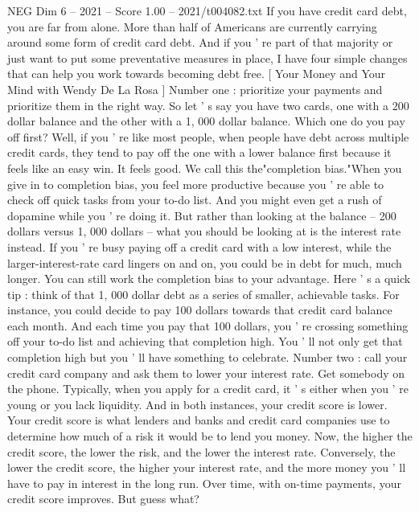 \begin{textsample}{NEG Dim 6 – 2021 – Score 1.00 – 2021/t004082.txt}  \label{ex:f6_neg_001}
If you have credit card debt, you are far from alone.
More than half of Americans are currently carrying around some form of credit card debt.
And if you ' re part of that majority or just want to put some preventative measures in place, I have four simple changes that can help you work towards becoming debt free. [ Your Money and Your Mind with Wendy De La Rosa ] Number one : prioritize your payments and prioritize them in the right way.
So let ' s say you have two cards, one with a 200 dollar balance and the other with a 1, 000 dollar balance.
Which one do you pay off first?
Well, if you ' re like most people, when people have debt across multiple credit cards, they tend to pay off the one with a lower balance first because it feels like an easy win.
It feels good.
We call this the"completion bias."When you give in to completion bias, you feel more productive because you ' re able to check off quick tasks from your to-do list.
And you might even get a rush of dopamine while you ' re doing it.
But rather than looking at the balance -- 200 dollars versus 1, 000 dollars -- what you should be looking at is the interest rate instead.
If you ' re busy paying off a credit card with a low interest, while the larger-interest-rate card lingers on and on, you could be in debt for much, much longer.
You can still work the completion bias to your advantage.
Here ' s a quick tip : think of that 1, 000 dollar debt as a series of smaller, achievable tasks.
For instance, you could decide to pay 100 dollars towards that credit card balance each month.
And each time you pay that 100 dollars, you ' re crossing something off your to-do list and achieving that completion high.
You ' ll not only get that completion high but you ' ll have something to celebrate.
Number two : call your credit card company and ask them to lower your interest rate.
Get somebody on the phone.
Typically, when you apply for a credit card, it ' s either when you ' re young or you lack liquidity.
And in both instances, your credit score is lower.
Your credit score is what lenders and banks and credit card companies use to determine how much of a risk it would be to lend you money.
Now, the higher the credit score, the lower the risk, and the lower the interest rate.
Conversely, the lower the credit score, the higher your interest rate, and the more money you ' ll have to pay in interest in the long run.
Over time, with on-time payments, your credit score improves.
But guess what?

\end{textsample}
